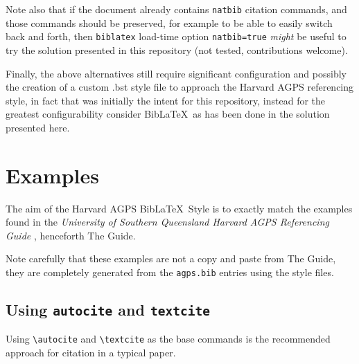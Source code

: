 \documentclass[a4paper, 11pt]{article}
\newcommand*{\BibLaTeX}{Bib\LaTeX}
\newcommand*{\subsectionRefSection}[1]{
    \subsection{#1}
    \refsection
}
\begin{document}
Note also that if the document already contains \texttt{natbib} citation commands, and those
commands should be preserved, for example to be able to easily switch back and forth, then
\texttt{biblatex} load-time option \texttt{natbib=true} \emph{might} be useful to try the solution
presented in this repository (not tested, contributions welcome).

Finally, the above alternatives still require significant configuration and possibly the creation of
a custom .bst style file to approach the Harvard AGPS referencing style, in fact that was initially
the intent for this repository, instead for the greatest configurability consider \BibLaTeX\ as has
been done in the solution presented here.

\newpage
\section{Examples}

The aim of the Harvard AGPS \BibLaTeX\ Style is to exactly match the examples found in the
\emph{University of Southern Queensland Harvard AGPS Referencing Guide}
\autocite{UniSQ2020HarvarAGPSRefere}, henceforth The Guide.

Note carefully that these examples are not a copy and paste from The Guide, they are completely
generated from the \texttt{agps.bib} entries using the style files.

\subsectionRefSection{Using \texttt{autocite} and \texttt{textcite}}
\label{subsec:UsingAutociteAndTextcite}

Using \verb|\autocite| and \verb|\textcite| as the base commands is the recommended approach for
citation in a typical paper.
\end{document}
